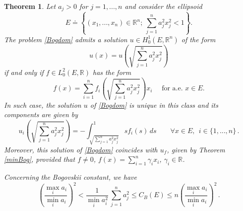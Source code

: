 \documentclass[11pt]{article}
\newtheorem{theorem}{Theorem}[section]
\theoremstyle{plain}
\theoremstyle{definition}
\numberwithin{equation}{section}
\newcommand{\R}{\mathbb{R}}
\begin{document}
\begin{theorem}\label{ellipsoid}
	Let $a_j>0$ for $j=1,...,n$ and consider the ellipsoid
	$$
	E\doteq\left\{(x_1,...,x_n)\in\R^n;\ \sum_{j=1}^na_j^2x_j^2<1\right\}.
	$$
	The problem \eqref{Bogdom} admits a solution $u\in H^1_0(E,\R^n)$ of the form
	$$
	u(x)=u\left(\sqrt{\sum_{j=1}^na_j^2x_j^2}\right)
	$$
	if and only if $f\in L^2_0(E,\R)$ has the form
	\begin{equation}\label{formf}
	f(x)=\sum_{i=1}^n f_i\left(\sqrt{\sum_{j=1}^na_j^2x_j^2}\right)x_i\quad\mbox{ for a.e. }x\in E.
	\end{equation}
	In such case, the solution $u$ of \eqref{Bogdom} is unique in this class and its components are given by
	$$
	u_i\left(\sqrt{\sum_{j=1}^na_j^2x_j^2}\right)=-\int_{\sqrt{\sum_{j=1}^na_j^2x_j^2}}^1sf_i(s)\, ds \qquad \forall x \in E,
	\ \ i \in \{1,...,n\}\, .
	$$
	Moreover, this solution of \eqref{Bogdom} coincides with $u_f$, given by Theorem \ref{minBog}, provided that $f\not=0$, $f(x)=\sum^n_{i=1}\gamma_i x_i$, $\gamma_i\in \R$.\par
	Concerning the Bogovskii constant, we have
	\begin{equation}\label{CBE}
	\left( \frac{\max_ia_i}{\min_ia_i}\right)^2<\frac{1}{\min_ia_i^2}\, \sum_{j=1}^{n}a_j^2\le C_B(E)\le n\left(\frac{\max_ia_i}{\min_ia_i}\right)^{2}\, .
	\end{equation}
\end{theorem}
\noindent
\end{document}
